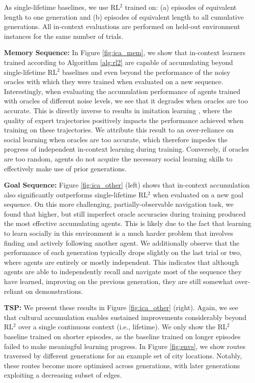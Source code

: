 \documentclass{article}
\begin{document}
As single-lifetime baselines, we use RL$^2$ trained on: (a) episodes of equivalent length to one generation and (b) episodes of equivalent length to all cumulative generations. All in-context evaluations are performed on held-out environment instances for the same number of trials. 

\textbf{Memory Sequence:} In Figure \ref{fig:ica_mem}, we show that in-context learners trained according to Algorithm \ref{alg:rl2} are capable of accumulating beyond single-lifetime RL$^2$ baselines and even beyond the performance of the noisy oracles with which they were trained when evaluated on a new sequence. Interestingly, when evaluating the accumulation performance of agents trained with oracles of different noise levels, we see that it degrades when oracles are too accurate. This is directly inverse to results in imitation learning \citep{Sasaki21}, where the quality of expert trajectories positively impacts the performance achieved when training on these trajectories. We attribute this result to an over-reliance on social learning when oracles are too accurate, which therefore impedes the progress of independent in-context learning during training. Conversely, if oracles are too random, agents do not acquire the necessary social learning skills to effectively make use of prior generations.

\textbf{Goal Sequence:} Figure \ref{fig:ica_other} (left) shows that in-context accumulation also significantly outperforms single-lifetime RL$^2$ when evaluated on a new goal sequence. On this more challenging, partially-observable navigation task, we found that higher, but still imperfect oracle accuracies during training produced the most effective accumulating agents. This is likely due to the fact that learning to learn socially in this environment is a much harder problem that involves finding and actively following another agent. We additionally observe that the performance of each generation typically drops slightly on the last trial or two, where agents are entirely or mostly independent. This indicates that although agents are able to independently recall and navigate most of the sequence they have learned, improving on the previous generation, they are still somewhat over-reliant on demonstrations.

\textbf{TSP:} We present these results in Figure \ref{fig:ica_other} (right). Again, we see that cultural accumulation enables sustained improvements considerably beyond RL$^2$ over a single continuous context (i.e., lifetime). We only show the RL$^2$ baseline trained on shorter episodes, as the baseline trained on longer episodes failed to make meaningful learning progress. In Figure \ref{fig:envs}, we show routes traversed by different generations for an example set of city locations. Notably, these routes become more optimised across generations, with later generations exploiting a decreasing subset of edges.
\end{document}
